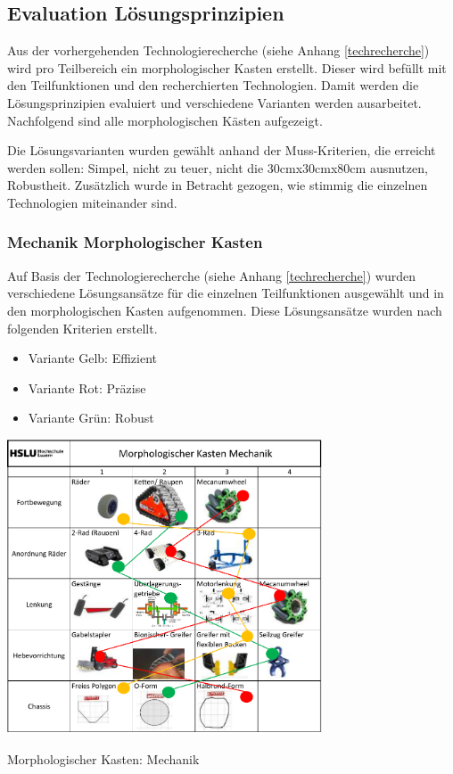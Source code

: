 \subsection{Evaluation Lösungsprinzipien}\label{mk}

Aus der vorhergehenden Technologierecherche (siehe Anhang \ref{techrecherche}) wird pro Teilbereich ein morphologischer Kasten erstellt. Dieser wird befüllt mit den Teilfunktionen und den recherchierten Technologien. Damit werden die Lösungsprinzipien evaluiert und verschiedene Varianten werden ausarbeitet. Nachfolgend sind alle morphologischen Kästen aufgezeigt.

Die Lösungsvarianten wurden gewählt anhand der Muss-Kriterien, die erreicht werden sollen: Simpel, nicht zu teuer, nicht die 30cmx30cmx80cm ausnutzen, Robustheit. Zusätzlich wurde in Betracht gezogen, wie stimmig die einzelnen Technologien miteinander sind.

\subsubsection{Mechanik Morphologischer Kasten}

Auf Basis der Technologierecherche (siehe Anhang \ref{techrecherche}) wurden verschiedene Lösungsansätze für die einzelnen Teilfunktionen ausgewählt und in den morphologischen Kasten aufgenommen.  Diese Lösungsansätze wurden nach folgenden Kriterien erstellt.

\begin{itemize}
    \item Variante Gelb: Effizient
    \item Variante Rot: Präzise
    \item Variante Grün: Robust
\end{itemize}

\begin{table}[H]
\centering
\includegraphics[width=0.7\textwidth]{assets/MK_Maschinentechnik.pdf}
\caption{Morphologischer Kasten: Mechanik}
\label{table:mk-mechanik}
\end{table}


